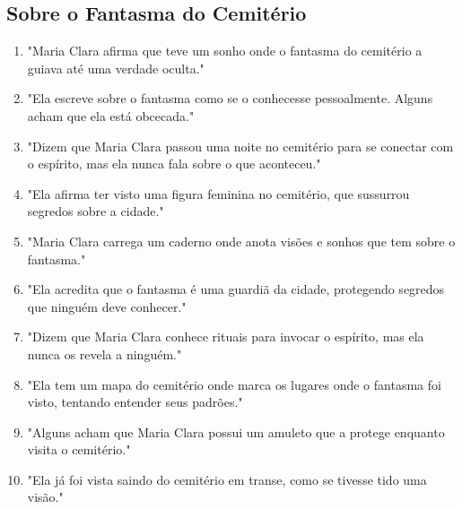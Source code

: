\subsection*{Sobre o Fantasma do Cemitério}
\begin{enumerate}
    \item "Maria Clara afirma que teve um sonho onde o fantasma do cemitério a guiava até uma verdade oculta."
    \item "Ela escreve sobre o fantasma como se o conhecesse pessoalmente. Alguns acham que ela está obcecada."
    \item "Dizem que Maria Clara passou uma noite no cemitério para se conectar com o espírito, mas ela nunca fala sobre o que aconteceu."
    \item "Ela afirma ter visto uma figura feminina no cemitério, que sussurrou segredos sobre a cidade."
    \item "Maria Clara carrega um caderno onde anota visões e sonhos que tem sobre o fantasma."
    \item "Ela acredita que o fantasma é uma guardiã da cidade, protegendo segredos que ninguém deve conhecer."
    \item "Dizem que Maria Clara conhece rituais para invocar o espírito, mas ela nunca os revela a ninguém."
    \item "Ela tem um mapa do cemitério onde marca os lugares onde o fantasma foi visto, tentando entender seus padrões."
    \item "Alguns acham que Maria Clara possui um amuleto que a protege enquanto visita o cemitério."
    \item "Ela já foi vista saindo do cemitério em transe, como se tivesse tido uma visão."
\end{enumerate}

